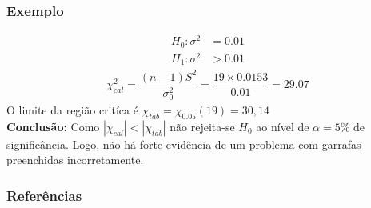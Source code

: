 \documentclass[14pt,aspectratio=1610]{beamer}
\newcommand{\Ho}{\ensuremath{H_{0}}}
\begin{document}
\begin{frame}{}
\frametitle{Exemplo}
\small
\begin{block}{}
\justifying
\begin{align*}
H_{0}: \sigma^{2}&=0.01 \\ 
H_{1}: \sigma^{2}&>0.01
\end{align*}
\begin{align}
\chi^{2}_{cal}=\dfrac{(n-1)S^{2}}{\sigma_{0}^{2}}=\dfrac{19\times0.0153}{0.01}=29.07
\end{align}
O limite da região critíca é $\chi_{tab}=\chi_{0.05}(19)=30,14$\\
\textbf{Conclusão:} Como $|\chi_{cal}|<|\chi_{tab}|$ não rejeita-se $\Ho$ ao nível de $\alpha=5\%$ de significância. Logo, não há forte evidência de um problema com 
garrafas preenchidas incorretamente.
\end{block}
\nocite{Morettin09, Apostila, eric, montgomery2016, meyer1982probabilidade, Bastos2025}
\end{frame}

\begin{frame}[allowframebreaks]
\frametitle{\bf Referências}
\printbibliography
\end{frame}
\end{document}

